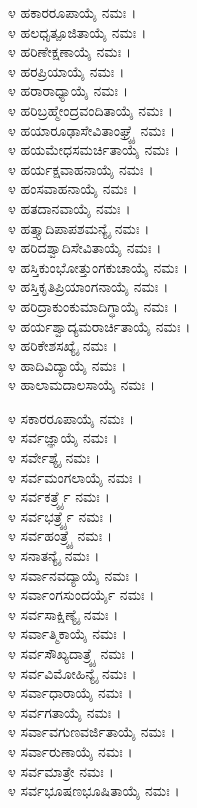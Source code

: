 ೪ ಹಕಾರರೂಪಾಯೈ ನಮಃ ।\\
೪ ಹಲಧೃತ್ಪೂಜಿತಾಯೈ ನಮಃ ।\\
೪ ಹರಿಣೇಕ್ಷಣಾಯೈ ನಮಃ ।\\
೪ ಹರಪ್ರಿಯಾಯೈ ನಮಃ ।\\
೪ ಹರಾರಾಧ್ಯಾಯೈ ನಮಃ ।\\
೪ ಹರಿಬ್ರಹ್ಮೇಂದ್ರವಂದಿತಾಯೈ ನಮಃ ।\\
೪ ಹಯಾರೂಢಾಸೇವಿತಾಂಘ್ರ್ಯೈ ನಮಃ ।\\
೪ ಹಯಮೇಧಸಮರ್ಚಿತಾಯೈ ನಮಃ ।\\
೪ ಹರ್ಯಕ್ಷವಾಹನಾಯೈ ನಮಃ ।\\
೪ ಹಂಸವಾಹನಾಯೈ ನಮಃ ।\\
೪ ಹತದಾನವಾಯೈ ನಮಃ ।\\
೪ ಹತ್ತ್ಯಾದಿಪಾಪಶಮನ್ಯೈ ನಮಃ ।\\
೪ ಹರಿದಶ್ವಾದಿಸೇವಿತಾಯೈ ನಮಃ ।\\
೪ ಹಸ್ತಿಕುಂಭೋತ್ತುಂಗಕುಚಾಯೈ ನಮಃ ।\\
೪ ಹಸ್ತಿಕೃತಿಪ್ರಿಯಾಂಗನಾಯೈ ನಮಃ ।\\
೪ ಹರಿದ್ರಾಕುಂಕುಮಾದಿಗ್ಧಾಯೈ ನಮಃ ।\\
೪ ಹರ್ಯಶ್ವಾದ್ಯಮರಾರ್ಚಿತಾಯೈ ನಮಃ ।\\
೪ ಹರಿಕೇಶಸಖ್ಯೈ ನಮಃ ।\\
೪ ಹಾದಿವಿದ್ಯಾಯೈ ನಮಃ ।\\
೪ ಹಾಲಾಮದಾಲಸಾಯೈ ನಮಃ ।


೪ ಸಕಾರರೂಪಾಯೈ ನಮಃ ।\\
೪ ಸರ್ವಜ್ಞಾಯೈ ನಮಃ ।\\
೪ ಸರ್ವೇಶ್ಯೈ ನಮಃ ।\\
೪ ಸರ್ವಮಂಗಲಾಯೈ ನಮಃ ।\\
೪ ಸರ್ವಕರ್ತ್ರ್ಯೈ ನಮಃ ।\\
೪ ಸರ್ವಭರ್ತ್ರ್ಯೈ ನಮಃ ।\\
೪ ಸರ್ವಹಂತ್ರ್ಯೈ ನಮಃ ।\\
೪ ಸನಾತನ್ಯೈ ನಮಃ ।\\
೪ ಸರ್ವಾನವದ್ಯಾಯೈ ನಮಃ ।\\
೪ ಸರ್ವಾಂಗಸುಂದರ್ಯೈ ನಮಃ ।\\
೪ ಸರ್ವಸಾಕ್ಷಿಣ್ಯೈ ನಮಃ ।\\
೪ ಸರ್ವಾತ್ಮಿಕಾಯೈ ನಮಃ ।\\
೪ ಸರ್ವಸೌಖ್ಯದಾತ್ರ್ಯೈ ನಮಃ ।\\
೪ ಸರ್ವವಿಮೋಹಿನ್ಯೈ ನಮಃ ।\\
೪ ಸರ್ವಾಧಾರಾಯೈ ನಮಃ ।\\
೪ ಸರ್ವಗತಾಯೈ ನಮಃ ।\\
೪ ಸರ್ವಾವಗುಣವರ್ಜಿತಾಯೈ ನಮಃ ।\\
೪ ಸರ್ವಾರುಣಾಯೈ ನಮಃ ।\\
೪ ಸರ್ವಮಾತ್ರೇ ನಮಃ ।\\
೪ ಸರ್ವಭೂಷಣಭೂಷಿತಾಯೈ ನಮಃ ।

